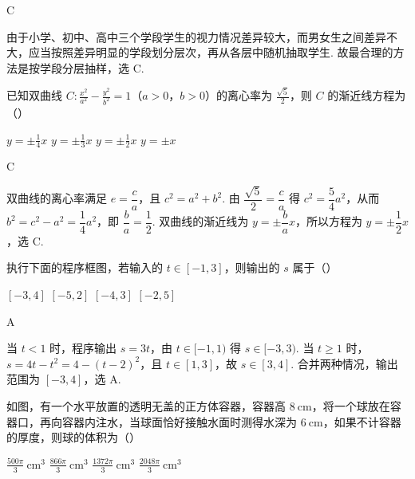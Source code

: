 \begin{answer}
C
\end{answer}

\begin{solution}
由于小学、初中、高中三个学段学生的视力情况差异较大，而男女生之间差异不大，应当按照差异明显的学段划分层次，再从各层中随机抽取学生. 故最合理的方法是按学段分层抽样，选 C.
\end{solution}

\begin{problem}
已知双曲线 \(C: \frac{x^2}{a^2} - \frac{y^2}{b^2} = 1\)（\(a > 0\)，\(b > 0\)）的离心率为 \(\frac{\sqrt{5}}{2}\)，则 \(C\) 的渐近线方程为（\quad）

\choices
    {\(y = \pm \frac{1}{4} x\)}
    {\(y = \pm \frac{1}{3}x\)}
    {\( y = \pm \frac{1}{2} x \)}
    {\(y = \pm x\)}
\end{problem}

\begin{answer}
C
\end{answer}

\begin{solution}
双曲线的离心率满足 \(e=\dfrac ca\)，且 \(c^2=a^2+b^2\). 由
\(\dfrac{\sqrt{5}}2=\dfrac ca\) 得 \(c^2=\dfrac54a^2\)，从而 \(b^2=c^2-a^2=\dfrac14a^2\)，即 \(\dfrac ba=\dfrac12\). 双曲线的渐近线为 \(y=\pm\dfrac ba x\)，所以方程为 \(y=\pm\dfrac12x\)，选 C.
\end{solution}

\begin{problem}
执行下面的程序框图，若输入的 \(t \in \left[-1, 3\right]\)，则输出的 \(s\) 属于（\quad）


\choices
    {\(\left[-3, 4\right]\)}
    {\(\left[-5, 2\right]\)}
    {\(\left[-4, 3\right]\)}
    {\(\left[-2, 5\right]\)}
\end{problem}

\begin{answer}
A
\end{answer}

\begin{solution}
当 \(t<1\) 时，程序输出 \(s=3t\)，由 \(t\in[-1,1)\) 得 \(s\in[-3,3)\). 当 \(t\geqslant1\) 时，\(s=4t-t^2=4-(t-2)^2\)，且 \(t\in[1,3]\)，故 \(s\in[3,4]\). 合并两种情况，输出范围为 \([-3,4]\)，选 A.
\end{solution}

\begin{problem}
如图，有一个水平放置的透明无盖的正方体容器，容器高 \(8\mathrm{~cm}\)，将一个球放在容器口，再向容器内注水，当球面恰好接触水面时测得水深为 \(6\mathrm{~cm}\)，如果不计容器的厚度，则球的体积为（\quad）

\begin{minipage}{\linewidth}
\end{minipage}

\choices
    {\(\frac{500\pi}{3}\mathrm{~cm}^{3}\)}
    {\(\frac{866\pi}{3}\mathrm{~cm}^{3}\)}
    {\(\frac{1372\pi}{3}\mathrm{~cm}^{3}\)}
    {\(\frac{2048\pi}{3}\mathrm{~cm}^{3}\)}
\end{problem}

